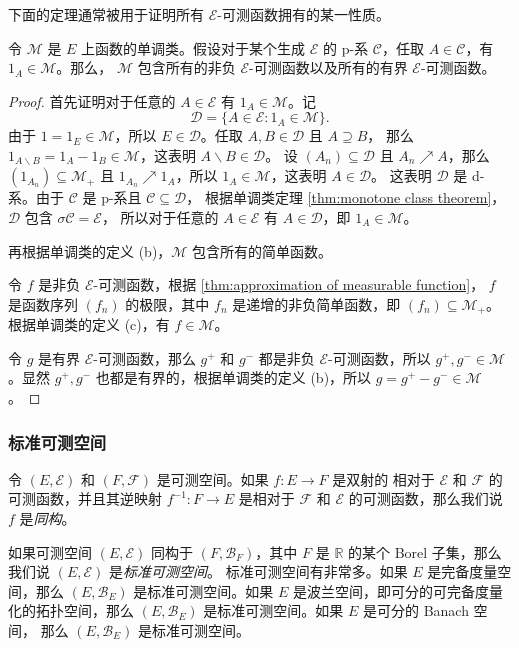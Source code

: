 \documentclass[fontset=none]{Notes}
\begin{document}
下面的定理通常被用于证明所有 $\mathcal{E}$-可测函数拥有的某一性质。

\begin{theorem}
  令 $\mathcal{M}$ 是 $E$ 上函数的单调类。假设对于某个生成 $\mathcal{E}$
  的 p-系 $\mathcal{C}$，任取 $A\in \mathcal{C}$，有 $1_A\in \mathcal{M}$。那么，
  $\mathcal{M}$ 包含所有的非负 $\mathcal{E}$-可测函数以及所有的有界 $\mathcal{E}$-可测函数。
\end{theorem} 
\begin{proof}
  首先证明对于任意的 $A\in \mathcal{E}$ 有 $1_A\in \mathcal{M}$。记
  \[
    \mathcal{D}=\{A\in \mathcal{E}:1_A\in \mathcal{M}\}.
  \]
  由于 $1=1_E\in \mathcal{M}$，所以 $E\in \mathcal{D}$。任取 $A,B\in \mathcal{D}$ 且 $A\supseteq B$，
  那么 $1_{A \smallsetminus B}=1_A-1_B\in \mathcal{M}$，这表明 $A \smallsetminus B\in \mathcal{D}$。
  设 $(A_n)\subseteq \mathcal{D}$ 且 $A_n\nearrow A$，那么 $(1_{A_n})\subseteq \mathcal{M}_+$
  且 $1_{A_n}\nearrow 1_A$，所以 $1_A\in \mathcal{M}$，这表明 $A\in \mathcal{D}$。
  这表明 $\mathcal{D}$ 是 d-系。由于 $\mathcal{C}$ 是 p-系且 $\mathcal{C}\subseteq \mathcal{D}$，
  根据单调类定理 \ref{thm:monotone class theorem}，$\mathcal{D}$ 包含 $\sigma \mathcal{C}=\mathcal{E}$，
  所以对于任意的 $A\in \mathcal{E}$ 有 $A\in \mathcal{D}$，即 $1_A\in \mathcal{M}$。

  再根据单调类的定义 (b)，$\mathcal{M}$ 包含所有的简单函数。

  令 $f$ 是非负 $\mathcal{E}$-可测函数，根据 \autoref{thm:approximation of measurable function}，
  $f$ 是函数序列 $(f_n)$ 的极限，其中 $f_n$ 是递增的非负简单函数，即 $(f_n)\subseteq \mathcal{M}_+$。
  根据单调类的定义 (c)，有 $f\in \mathcal{M}$。

  令 $g$ 是有界 $\mathcal{E}$-可测函数，那么 $g^+$ 和 $g^-$ 都是非负 $\mathcal{E}$-可测函数，所以
  $g^+,g^-\in \mathcal{M}$。显然 $g^+,g^-$ 也都是有界的，根据单调类的定义 (b)，所以
  $g=g^+-g^-\in \mathcal{M}$。
\end{proof}

\subsubsection{标准可测空间}

令 $(E,\mathcal{E})$ 和 $(F,\mathcal{F})$ 是可测空间。如果 $f:E\to F$ 是双射的
相对于 $\mathcal{E}$ 和 $\mathcal{F}$ 的可测函数，并且其逆映射 $f^{-1}:F\to E$
是相对于 $\mathcal{F}$ 和 $\mathcal{E}$ 的可测函数，那么我们说 $f$ 是\emph{同构}。

如果可测空间 $(E,\mathcal{E})$ 同构于 $(F,\mathcal{B}_F)$，其中 $F$ 是 $\mathbb{R}$
的某个 Borel 子集，那么我们说 $(E,\mathcal{E})$ 是\emph{标准可测空间}。
标准可测空间有非常多。如果 $E$ 是完备度量空间，那么 $(E,\mathcal{B}_E)$
是标准可测空间。如果 $E$ 是波兰空间，即可分的可完备度量化的拓扑空间，那么
$(E,\mathcal{B}_E)$ 是标准可测空间。如果 $E$ 是可分的 Banach 空间，
那么 $(E,\mathcal{B}_E)$ 是标准可测空间。
\end{document}
